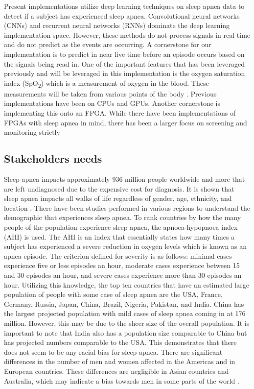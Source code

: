 \documentclass[12pt,titlepage]{article}
\begin{document}
Present implementations utilize deep learning techniques on sleep apnea data to detect if a subject has experienced sleep apnea. Convolutional neural networks (CNNs)
and recurrent neural networks (RNNs) dominate the deep learning implementation space. However, these methods do not process signals in real-time and do not predict as 
the events are occurring. A cornerstone for our implementation is to predict in near live time before an episode occurs based on the signals being read in. One of the 
important features that has been leveraged previously and will be leveraged in this implementation is the oxygen saturation index (SpO\textsubscript{2}) which is a 
measurement of oxygen in the blood. These measurements will be taken from various points of the body \cite{mostafa}. Previous implementations have been on CPUs and GPUs. 
Another cornerstone is implementing this onto an FPGA. While there have been implementations of FPGAs with sleep apnea in mind, there has been a larger focus on screening 
and monitoring strictly \cite{ashmouny}

\subsection{Stakeholders needs}
Sleep apnea impacts approximately 936 million people worldwide and more that are left undiagnosed due to the expensive cost for diagnosis. It is shown that sleep
apnea impacts all walks of life regardless of gender, age, ethnicity, and location \cite{atsjournals}. There have been studies performed in various regions to
understand the demographic that experiences sleep apnea. To rank countries by how the many people of the population experience sleep apnea, the apnoea-hypopnoea
index (AHI) is used. The AHI is an index that essentially states how many times a subject has experienced a severe reduction in oxygen levels which is known as
an apnea episode. The criterion defined for severity is as follows: minimal cases experience five or less episodes an hour, moderate cases experience between 15
and 30 episodes an hour, and severe cases experience more than 30 episodes an hour. Utilizing this knowledge, the top ten countries that have an estimated large
population of people with some case of sleep apnea are the USA, France, Germany, Russia, Japan, China, Brazil, Nigeria, Pakistan, and India. China has the largest
projected population with mild cases of sleep apnea coming in at 176 million. However, this may be due to the sheer size of the overall population. It is important
to note that India also has a population size comparable to China but has projected numbers comparable to the USA. This demonstrates that there does not seem to be
any racial bias for sleep apnea. There are significant differences in the number of men and women affected in the Americas and in European countries. These differences
are negligible in Asian countries and Australia, which may indicate a bias towards men in some parts of the world \cite{benjafield}.
\end{document}
